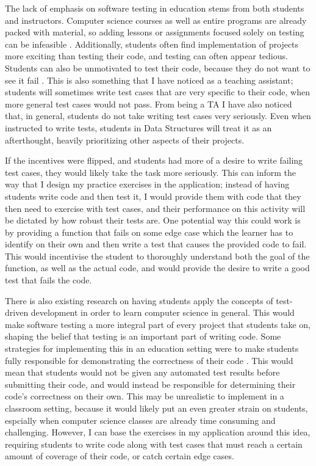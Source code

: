 \documentclass[10pt,twocolumn]{article}
\begin{document}
The lack of emphasis on software testing in education stems from both students and instructors. Computer science courses 
as well as entire programs are already packed with material, so adding lessons or assignments focused solely on testing 
can be infeasible \cite{Edwards2003Article2}. Additionally, students often find implementation of projects more exciting 
than testing their code, and testing can often appear tedious. Students can also be unmotivated to 
test their code, because they do not want to see it fail \cite{Carrington1997Article}. This is also something that I 
have noticed as a teaching assistant; students will sometimes write test cases that are very specific to their code, 
when more general test cases would not pass. From being a TA I have also noticed that, in general, students do not take 
writing test cases very seriously. Even when instructed to write tests, students in Data Structures will treat it as an 
afterthought, heavily prioritizing other aspects of their projects. 

If the incentives were flipped, and students had 
more of a desire to write failing test cases, they would likely take the task more seriously. This can inform the way 
that I design my practice exercises in the application; instead of having students write code and then test it, I would 
provide them with code that they then need to exercise with test cases, and their performance on this activity will be 
dictated by how robust their tests are. One potential way this could work is by providing a function that fails on some 
edge case which the learner has to identify on their own and then write a test that causes the provided code to fail. 
This would incentivise the student to thoroughly understand both the goal of the function, as well as the actual code, 
and would provide the desire to write a good test that fails the code. 

There is also existing research on having students apply the concepts of test-driven development in order to learn 
computer science in general. This would make software testing a more integral part of every project that students take 
on, shaping the belief that testing is an important part of writing code. Some strategies for implementing this in an 
education setting were to make students fully responsible for demonstrating the correctness of their code 
\cite{Edwards2003Article1}. This would mean that students would not be given any automated test results before 
submitting their code, and would instead be responsible for determining their code's correctness on their own. This may 
be unrealistic to implement in a classroom setting, because it would likely put an even greater strain on students, 
espcially when computer science classes are already time consuming and challenging. However, I can base the exercises in 
my application around this idea, requiring students to write code along with test cases that must reach a certain amount 
of coverage of their code, or catch certain edge cases. 
\end{document}
